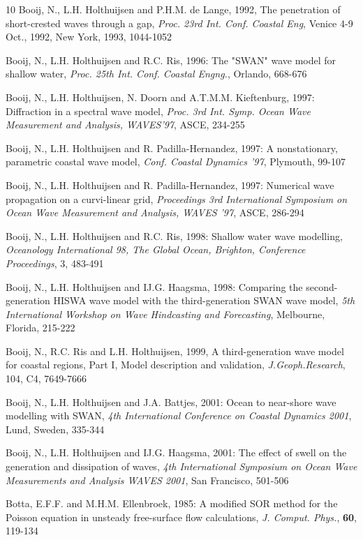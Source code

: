 \documentclass[12pt]{book}
\begin{document}
\begin{thebibliography}{10}
Booij, N., L.H. Holthuijsen and P.H.M. de Lange, 1992, The penetration of short-crested waves through
a gap, {\it Proc. 23rd Int. Conf. Coastal Eng}, Venice 4-9 Oct., 1992, New York, 1993, 1044-1052

Booij, N., L.H. Holthuijsen and R.C. Ris, 1996: The "SWAN" wave model for shallow water, {\it Proc. 25th Int.
Conf. Coastal Engng.}, Orlando, 668-676

Booij, N., L.H. Holthuijsen, N. Doorn and A.T.M.M. Kieftenburg, 1997: Diffraction in a spectral wave model,
{\it Proc. 3rd Int. Symp. Ocean Wave Measurement and Analysis, WAVES'97}, ASCE, 234-255

Booij, N., L.H. Holthuijsen and R. Padilla-Hernandez, 1997: A nonstationary, parametric coastal wave
model, {\it Conf. Coastal Dynamics '97}, Plymouth, 99-107

Booij, N., L.H. Holthuijsen and R. Padilla-Hernandez, 1997: Numerical wave propagation on a curvi-linear
grid, {\it Proceedings 3rd International Symposium on Ocean Wave Measurement and Analysis, WAVES '97}, ASCE, 286-294

Booij, N., L.H. Holthuijsen and R.C. Ris, 1998: Shallow water wave modelling, {\it Oceanology International
98, The Global Ocean, Brighton, Conference Proceedings}, 3, 483-491

Booij, N., L.H. Holthuijsen and IJ.G. Haagsma, 1998: Comparing the second-generation HISWA wave
model with the third-generation SWAN wave model, {\it 5th International Workshop on Wave
Hindcasting and Forecasting}, Melbourne, Florida, 215-222

Booij, N., R.C. Ris and L.H. Holthuijsen, 1999, A third-generation wave model for coastal regions, Part I,
Model description and validation, {\it J.Geoph.Research}, 104, C4, 7649-7666

Booij, N., L.H. Holthuijsen and J.A. Battjes, 2001: Ocean to near-shore wave modelling with SWAN,
{\it 4th International Conference on Coastal Dynamics 2001}, Lund, Sweden, 335-344

Booij, N., L.H. Holthuijsen and IJ.G. Haagsma, 2001: The effect of swell on the generation and dissipation
of waves, {\it 4th International Symposium on Ocean Wave Measurements and Analysis WAVES 2001},
San Francisco, 501-506

Botta, E.F.F. and M.H.M. Ellenbroek, 1985: A modified SOR method for the Poisson equation in unsteady free-surface
flow calculations, {\it J. Comput. Phys.}, {\bf 60}, 119-134


\end{thebibliography}
\end{document}
